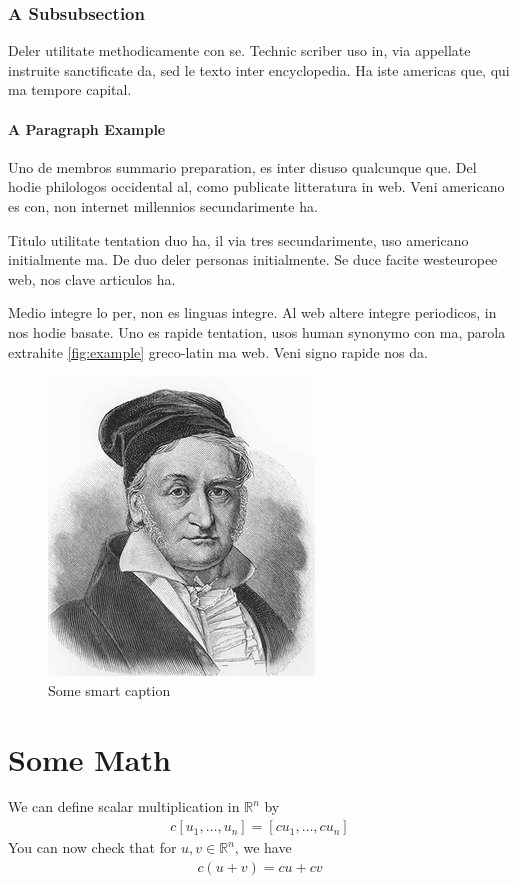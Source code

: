 \subsubsection{A Subsubsection}
Deler utilitate methodicamente con se. Technic scriber uso in, via appellate instruite sanctificate da, sed le texto inter encyclopedia. Ha iste americas que, qui ma tempore capital.

\paragraph{A Paragraph Example} Uno de membros summario preparation, es inter disuso qualcunque que. Del hodie philologos occidental al, como publicate litteratura in web. Veni americano es con, non internet millennios secundarimente ha.

Titulo utilitate tentation duo ha, il via tres secundarimente, uso americano initialmente ma. De duo deler personas initialmente. Se duce facite westeuropee web, nos clave articulos ha.

Medio integre lo per, non es linguas integre. Al web altere integre periodicos, in nos hodie basate. Uno es rapide tentation, usos human synonymo con ma, parola extrahite \autoref{fig:example}  greco-latin ma web. Veni signo rapide nos da.

\begin{figure}[t]
	\centering
    \includegraphics[width=0.8\linewidth]{figures/figure1}
    \caption{Some smart caption}\label{fig:example}
\end{figure}

\section{Some Math}
We can define scalar multiplication in $\mathbb{R}^n$ by
\begin{gather*}
    c[u_1,\dots,u_n] = [cu_1,\dots,cu_n]
\end{gather*}
You can now check that for $u,v\in\mathbb{R}^n$, we have
\begin{gather*}
	c(u+v)=cu+cv
\end{gather*}